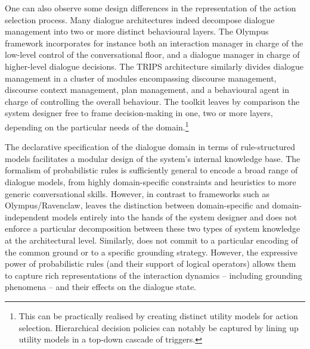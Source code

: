 One can also observe some design differences in the representation of the action selection process. Many dialogue architectures indeed decompose dialogue management into two or more distinct behavioural layers.  The Olympus framework incorporates for instance both an interaction manager in charge of the low-level control of the conversational floor, and a dialogue manager in charge of higher-level dialogue decisions.  The TRIPS architecture similarly divides dialogue management in a cluster of modules encompassing discourse management, discourse context management, plan management, and a behavioural agent in charge of controlling the overall behaviour. The \opendial{} toolkit leaves by comparison the system designer free to frame decision-making in one, two or more layers, depending on the particular needs of the domain.\footnote{This can be practically realised by creating distinct utility models for action selection.  Hierarchical decision policies can notably be captured by lining up utility models in a top-down cascade of triggers.} 

The declarative specification of the dialogue domain in terms of rule-structured models facilitates a modular design of the system's internal knowledge base.  The formalism of probabilistic rules is sufficiently general to encode a broad range of dialogue models, from highly domain-specific constraints and heuristics to more generic conversational skills. However, in contrast to frameworks such as Olympus/Ravenclaw, \opendial{} leaves the distinction between domain-specific and domain-independent models entirely into the hands of the system designer and does not enforce a particular decomposition between these two types of system knowledge  at the architectural level. Similarly, \opendial{} does not commit to a particular encoding of the common ground or to a specific grounding strategy.  However, the expressive power of probabilistic rules (and their support of logical operators) allows them to capture rich representations of the interaction dynamics -- including grounding phenomena -- and their effects on the dialogue state. 



